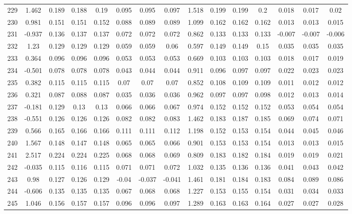\begin{table}[H]
{\begin{tabular}{l|c|ccc|ccc|c|ccc|ccc}
			229 & 1.462 & 0.189 & 0.188 & 0.19 & 0.095 & 0.095 & 0.097 & 1.518 & 0.199 & 0.199 & 0.2 & 0.018 & 0.017 & 0.02 \\
			230 & 0.981 & 0.151 & 0.151 & 0.152 & 0.088 & 0.089 & 0.089 & 1.099 & 0.162 & 0.162 & 0.162 & 0.013 & 0.013 & 0.015 \\
			231 & -0.937 & 0.136 & 0.137 & 0.137 & 0.072 & 0.072 & 0.072 & 0.862 & 0.133 & 0.133 & 0.133 & -0.007 & -0.007 & -0.006 \\
			232 & 1.23 & 0.129 & 0.129 & 0.129 & 0.059 & 0.059 & 0.06 & 0.597 & 0.149 & 0.149 & 0.15 & 0.035 & 0.035 & 0.035 \\
			233 & 0.364 & 0.096 & 0.096 & 0.096 & 0.053 & 0.053 & 0.053 & 0.669 & 0.103 & 0.103 & 0.103 & 0.018 & 0.017 & 0.019 \\
			234 & -0.501 & 0.078 & 0.078 & 0.078 & 0.043 & 0.044 & 0.044 & 0.911 & 0.096 & 0.097 & 0.097 & 0.022 & 0.023 & 0.023 \\
			235 & 0.382 & 0.115 & 0.115 & 0.115 & 0.07 & 0.07 & 0.07 & 0.852 & 0.108 & 0.109 & 0.109 & 0.011 & 0.012 & 0.012 \\
			236 & 0.321 & 0.087 & 0.088 & 0.087 & 0.035 & 0.036 & 0.036 & 0.962 & 0.097 & 0.097 & 0.098 & 0.012 & 0.013 & 0.014 \\
			237 & -0.181 & 0.129 & 0.13 & 0.13 & 0.066 & 0.066 & 0.067 & 0.974 & 0.152 & 0.152 & 0.152 & 0.053 & 0.054 & 0.054 \\
			238 & -0.551 & 0.126 & 0.126 & 0.126 & 0.082 & 0.082 & 0.083 & 1.462 & 0.183 & 0.187 & 0.185 & 0.069 & 0.074 & 0.071 \\
			239 & 0.566 & 0.165 & 0.166 & 0.166 & 0.111 & 0.111 & 0.112 & 1.198 & 0.152 & 0.153 & 0.154 & 0.044 & 0.045 & 0.046 \\
			240 & 1.567 & 0.148 & 0.147 & 0.148 & 0.065 & 0.065 & 0.066 & 0.901 & 0.153 & 0.153 & 0.154 & 0.013 & 0.013 & 0.015 \\
			241 & 2.517 & 0.224 & 0.224 & 0.225 & 0.068 & 0.068 & 0.069 & 0.809 & 0.183 & 0.182 & 0.184 & 0.019 & 0.019 & 0.021 \\
			242 & -0.035 & 0.115 & 0.116 & 0.115 & 0.071 & 0.071 & 0.072 & 1.032 & 0.135 & 0.136 & 0.136 & 0.041 & 0.043 & 0.042 \\
			243 & 0.98 & 0.127 & 0.126 & 0.129 & -0.04 & -0.037 & -0.041 & 1.461 & 0.181 & 0.184 & 0.183 & 0.084 & 0.089 & 0.086 \\
			244 & -0.606 & 0.135 & 0.135 & 0.135 & 0.067 & 0.068 & 0.068 & 1.227 & 0.153 & 0.155 & 0.154 & 0.031 & 0.034 & 0.033 \\
			245 & 1.046 & 0.156 & 0.157 & 0.157 & 0.096 & 0.096 & 0.097 & 1.289 & 0.163 & 0.163 & 0.164 & 0.027 & 0.027 & 0.028 \\

\end{tabular}}
\end{table}
